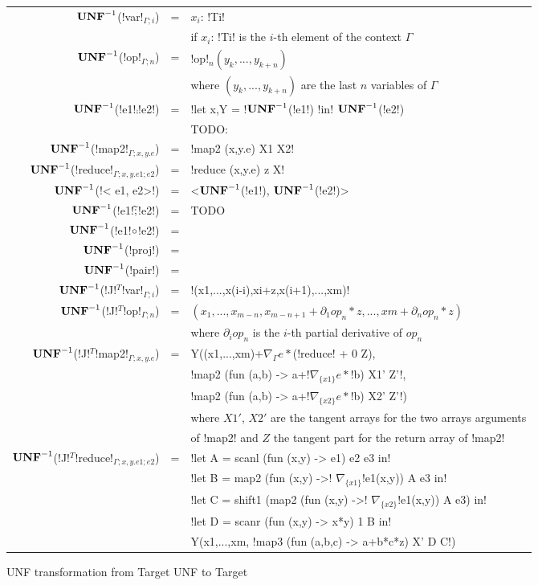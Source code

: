 \begin{figure*}[t]
    \begin{tabular}{r c l}
    $\mathbf{UNF}^{-1}$(!var!$_{\Gamma;i}$) &=& $x_i$: !Ti! \\
    && if $x_i$: !Ti! is the $i$-th element of the context $\Gamma$ \\
    $\mathbf{UNF}^{-1}$(!op!$_{\Gamma;n}$) &=& !op!$_n(y_k,...,y_{k+n})$ \\
    && where $(y_k,...,y_{k+n})$ are the last $n$ variables of $\Gamma$ \\ 
    $\mathbf{UNF}^{-1}$(!e1!$\comp$!e2!) &=& !let x,Y = !$\mathbf{UNF}^{-1}$(!e1!) !in! $\mathbf{UNF}^{-1}$(!e2!) \\ 
    && TODO: \\ 
    $\mathbf{UNF}^{-1}$(!map2!$_{\Gamma;x,y.e}$) &=& !map2 (x,y.e) X1 X2! \\ 
    $\mathbf{UNF}^{-1}$(!reduce!$_{\Gamma;x,y.e1;e2}$) &=& !reduce (x,y.e) z X! \\ 
    $\mathbf{UNF}^{-1}$(!< e1, e2>!) &=& <$\mathbf{UNF}^{-1}$(!e1!), $\mathbf{UNF}^{-1}$(!e2!)> \\
    $\mathbf{UNF}^{-1}$(!e1!$\widetilde{;}$!e2!) &=& TODO \\
    $\mathbf{UNF}^{-1}$(!e1!$\circ$!e2!) &=& \\
    $\mathbf{UNF}^{-1}$(!proj!) &=& \\
    $\mathbf{UNF}^{-1}$(!pair!) &=& \\
    $\mathbf{UNF}^{-1}$(!J!$^T$!var!$_{\Gamma;i}$) &=& !(x1,...,x(i-i),xi+z,x(i+1),...,xm)! \\
    $\mathbf{UNF}^{-1}$(!J!$^T$!op!$_{\Gamma;n}$) &=& $(x_1,...,x_{m-n},x_{m-n+1}+\partial_1op_n*z,...,xm+\partial_nop_n*z)$ \\
    && where $\partial_iop_n$ is the $i$-th partial derivative of $op_n$ \\
    $\mathbf{UNF}^{-1}$(!J!$^T$!map2!$_{\Gamma;x,y.e}$) &=&  Y((x1,...,xm)+$\nabla_{\Gamma}e *$(!reduce! + 0 Z),\\
    && !map2 (fun (a,b) -> a+!$\nabla_{\{x1\}}e *$!b) X1' Z'!, \\
    && !map2 (fun (a,b) -> a+!$\nabla_{\{x2\}}e *$!b) X2' Z'!) \\
    && where $X1'$, $X2'$ are the tangent arrays for the two arrays arguments \\
    && of !map2! and $Z$ the tangent part for the return array of !map2! \\
    $\mathbf{UNF}^{-1}$(!J!$^T$!reduce!$_{\Gamma;x,y.e1;e2}$) &=& !let A = scanl (fun (x,y) -> e1) e2 e3 in! \\
    && !let B = map2 (fun (x,y) ->! $\nabla_{\{x1\}}$!e1(x,y)) A e3 in!\\
    && !let C = shift1 (map2 (fun (x,y) ->! $\nabla_{\{x2\}}$!e1(x,y)) A e3) in!\\
    && !let D = scanr (fun (x,y) -> x*y) 1 B in!\\
    && Y(x1,...,xm, !map3 (fun (a,b,c) -> a+b*c*z) X' D C!)
    \end{tabular}
    \caption{UNF transformation from Target UNF to Target}
    \label{fig:unf_to_target}
    \end{figure*}
